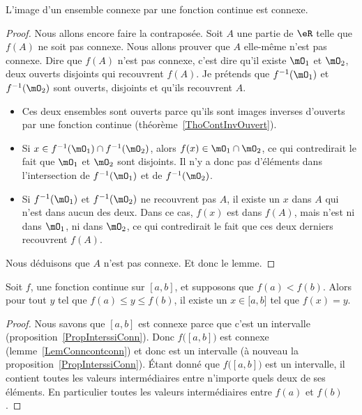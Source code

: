 \begin{lemma}   \label{LemConncontconn}
	L'image d'un ensemble connexe par une fonction continue est connexe.
\end{lemma}

\begin{proof}
	Nous allons encore faire la contraposée. Soit $A$ une partie de $\eR$ telle que $f(A)$ ne soit pas connexe. Nous allons prouver que $A$ elle-même n'est pas connexe. Dire que $f(A)$ n'est pas connexe, c'est dire qu'il existe $\mO_1$ et $\mO_2$, deux ouverts disjoints qui recouvrent $f(A)$. Je prétends que $f^{-1}(\mO_1)$ et $f^{-1}(\mO_2)$ sont ouverts, disjoints et qu'ils recouvrent $A$.
	\begin{itemize}
		\item Ces deux ensembles sont ouverts parce qu'ils sont images inverses d'ouverts par une fonction continue (théorème~\ref{ThoContInvOuvert}).
		\item Si $x\in f^{-1}(\mO_1)\cap f^{-1}(\mO_2)$, alors $f(x)\in \mO_1\cap\mO_2$, ce qui contredirait le fait que $\mO_1$ et $\mO_2$ sont disjoints. Il n'y a donc pas d'éléments dans l'intersection de $f^{-1}(\mO_1)$ et de $f^{-1}(\mO_2)$.
		\item Si $f^{-1}(\mO_1)$ et $f^{-1}(\mO_2)$ ne recouvrent pas $A$, il existe un $x$ dans $A$ qui n'est dans aucun des deux. Dans ce cas, $f(x)$ est dans $f(A)$, mais n'est ni dans $\mO_1$, ni dans $\mO_2$, ce qui contredirait le fait que ces deux derniers recouvrent $f(A)$.
	\end{itemize}
	Nous déduisons que $A$ n'est pas connexe. Et donc le lemme.
\end{proof}

\begin{theorem}        \label{ThoValInter}
	Soit $f$, une fonction continue sur $[a,b]$, et supposons que $f(a)<f(b)$. Alors pour tout $y$ tel que $f(a)\leq y\leq f(b)$, il existe un \( x\in\mathopen[ a , b \mathclose]\) tel que $f(x)=y$.
\end{theorem}

\begin{proof}
	Nous savons que $[a,b]$ est connexe parce que c'est un intervalle (proposition~\ref{PropInterssiConn}). Donc $f\big( [a,b] \big)$ est connexe (lemme~\ref{LemConncontconn}) et donc est un intervalle (à nouveau la proposition~\ref{PropInterssiConn}). Étant donné que $f\big( [a,b] \big)$ est un intervalle, il contient toutes les valeurs intermédiaires entre n'importe quels deux de ses éléments. En particulier toutes les valeurs intermédiaires entre $f(a)$ et $f(b)$.
\end{proof}

